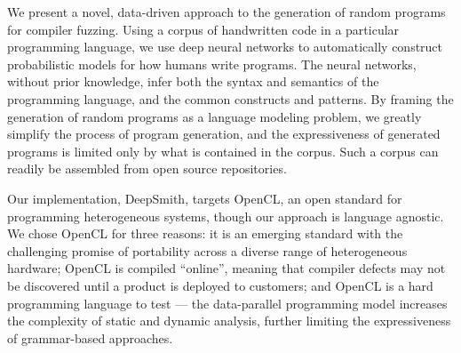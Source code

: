 

We present a novel, data-driven approach to the generation of random programs for compiler fuzzing. Using a corpus of handwritten code in a particular programming language, we use deep neural networks to automatically construct probabilistic models for how humans write programs. The neural networks, without prior knowledge, infer both the syntax and semantics of the programming language, and the common constructs and patterns. By framing the generation of random programs as a language modeling problem, we greatly simplify the process of program generation, and the expressiveness of generated programs is limited only by what is contained in the corpus. Such a corpus can readily be assembled from open source repositories.


Our implementation, DeepSmith, targets OpenCL, an open standard for programming heterogeneous systems, though our approach is language agnostic. We chose OpenCL for three reasons: it is an emerging standard with the challenging promise of portability across a diverse range of heterogeneous hardware; OpenCL is compiled ``online'', meaning that compiler defects may not be discovered until a product is deployed to customers; and OpenCL is a hard programming language to test  --- the data-parallel programming model increases the complexity of static and dynamic analysis, further limiting the expressiveness of grammar-based approaches.

